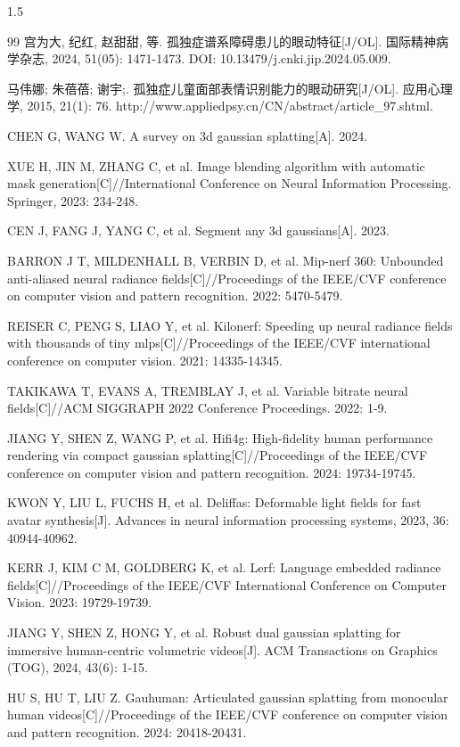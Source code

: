 \documentclass[zihao=-4]{ctexart}
\begin{document}
\begin{spacing}{1.5}
\begin{thebibliography}{99}
 宫为大, 纪红, 赵甜甜, 等. 孤独症谱系障碍患儿的眼动特征[J/OL]. 国际精神病学杂志, 2024, 51(05): 1471-1473. DOI: 10.13479/j.cnki.jip.2024.05.009.

 马伟娜; 朱蓓蓓; 谢宇;. 孤独症儿童面部表情识别能力的眼动研究[J/OL]. 应用心理学, 2015, 21(1): 76. http://www.appliedpsy.cn/CN/abstract/article\_97.shtml.

 CHEN G, WANG W. A survey on 3d gaussian splatting[A]. 2024.

 XUE H, JIN M, ZHANG C, et al. Image blending algorithm with automatic mask generation[C]//International Conference on Neural Information Processing. Springer, 2023: 234-248.

 CEN J, FANG J, YANG C, et al. Segment any 3d gaussians[A]. 2023.

 BARRON J T, MILDENHALL B, VERBIN D, et al. Mip-nerf 360: Unbounded anti-aliased neural radiance fields[C]//Proceedings of the IEEE/CVF conference on computer vision and pattern recognition. 2022: 5470-5479.

 REISER C, PENG S, LIAO Y, et al. Kilonerf: Speeding up neural radiance fields with thousands of tiny mlps[C]//Proceedings of the IEEE/CVF international conference on computer vision. 2021: 14335-14345.

 TAKIKAWA T, EVANS A, TREMBLAY J, et al. Variable bitrate neural fields[C]//ACM SIGGRAPH 2022 Conference Proceedings. 2022: 1-9.

 JIANG Y, SHEN Z, WANG P, et al. Hifi4g: High-fidelity human performance rendering via compact gaussian splatting[C]//Proceedings of the IEEE/CVF conference on computer vision and pattern recognition. 2024: 19734-19745.

 KWON Y, LIU L, FUCHS H, et al. Deliffas: Deformable light fields for fast avatar synthesis[J]. Advances in neural information processing systems, 2023, 36: 40944-40962.

 KERR J, KIM C M, GOLDBERG K, et al. Lerf: Language embedded radiance fields[C]//Proceedings of the IEEE/CVF International Conference on Computer Vision. 2023: 19729-19739.

 JIANG Y, SHEN Z, HONG Y, et al. Robust dual gaussian splatting for immersive human-centric volumetric videos[J]. ACM Transactions on Graphics (TOG), 2024, 43(6): 1-15.

 HU S, HU T, LIU Z. Gauhuman: Articulated gaussian splatting from monocular human videos[C]//Proceedings of the IEEE/CVF conference on computer vision and pattern recognition. 2024: 20418-20431.


\end{thebibliography}
\end{spacing}
\end{document}
